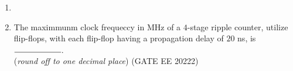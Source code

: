 \begin{enumerate}[label=\arabic*.,ref=\theenumi]
\item 
\item The maximmunm clock frequeccy in MHz of a $4$-stage ripple counter, utilize flip-flops, with each flip-flop having a propagation delay of $20$ ns, is $\rule{2cm}{0.15mm}$.\\
(\textit{round off to one decimal place})
\hfill{(GATE EE 20222)}



\end{enumerate}
